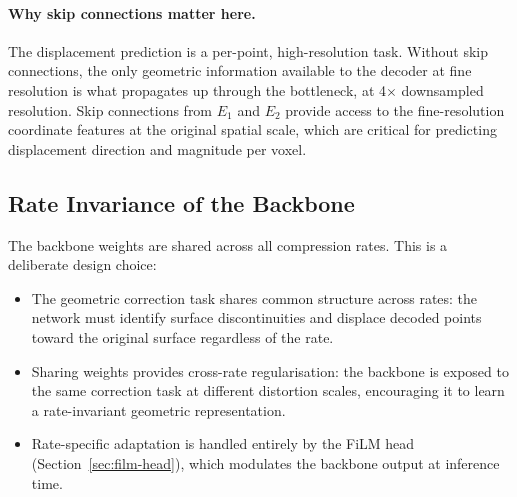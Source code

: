 \paragraph{Why skip connections matter here.}
The displacement prediction is a per-point, high-resolution task.
Without skip connections, the only geometric information available to the
decoder at fine resolution is what propagates up through the bottleneck,
at 4$\times$ downsampled resolution.
Skip connections from $E_1$ and $E_2$ provide access to the fine-resolution
coordinate features at the original spatial scale, which are critical for
predicting displacement direction and magnitude per voxel.

\subsection{Rate Invariance of the Backbone}

The backbone weights are shared across all compression rates.
This is a deliberate design choice:
\begin{itemize}
  \item The geometric correction task shares common structure across rates:
    the network must identify surface discontinuities and displace decoded
    points toward the original surface regardless of the rate.
  \item Sharing weights provides cross-rate regularisation: the backbone
    is exposed to the same correction task at different distortion scales,
    encouraging it to learn a rate-invariant geometric representation.
  \item Rate-specific adaptation is handled entirely by the FiLM head
    (Section~\ref{sec:film-head}), which modulates the backbone output at
    inference time.
\end{itemize}

